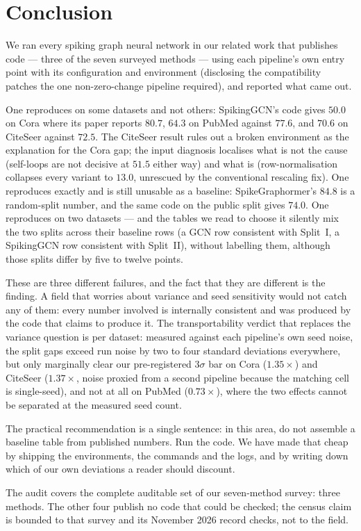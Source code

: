 \section{Conclusion}
\label{sec:conclusion}

We ran every spiking graph neural network in our related work that publishes code --- three of the
seven surveyed methods --- using each pipeline's own entry point with its configuration and
environment (disclosing the compatibility patches the one non-zero-change pipeline required), and reported what came
out.

One reproduces on some datasets and not others: SpikingGCN's code gives $50.0$ on Cora where its
paper reports $80.7$, $64.3$ on PubMed against $77.6$, and $70.6$ on CiteSeer against $72.5$. The
CiteSeer result rules out a broken environment as the explanation for the Cora gap; the input
diagnosis localises what is not the cause (self-loops are not decisive at $51.5$ either way) and
what is (row-normalisation collapses every variant to $13.0$, unrescued by the conventional
rescaling fix). One reproduces exactly and is still unusable as a baseline:
SpikeGraphormer's $84.8$ is a random-split number, and the same code on the public split gives
$74.0$. One reproduces on two datasets --- and the tables we read to choose it silently mix the
two splits across their baseline rows (a GCN row consistent with Split~I, a SpikingGCN row
consistent with Split~II), without labelling them, although those splits differ by
five to twelve points.

These are three different failures, and the fact that they are different is the finding. A field that
worries about variance and seed sensitivity would not catch any of them: every number involved is
internally consistent and was produced by the code that claims to produce it. The transportability
verdict that replaces the variance question is per dataset: measured against each pipeline's own
seed noise, the split gaps exceed run noise by two to four standard deviations everywhere, but only
marginally clear our pre-registered $3\sigma$ bar on Cora ($1.35\times$) and CiteSeer
($1.37\times$, noise proxied from a second pipeline because the matching cell is single-seed),
and not at all on PubMed ($0.73\times$), where the two effects cannot be separated at the measured
seed count.

The practical recommendation is a single sentence: in this area, do not assemble a baseline table from
published numbers. Run the code. We have made that cheap by shipping the environments, the commands
and the logs, and by writing down which of our own deviations a reader should discount.

The audit covers the complete auditable set of our seven-method survey: three methods. The other four
publish no code that could be checked; the census claim is bounded to that survey and its November
2026 record checks, not to the field.
